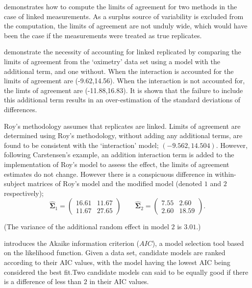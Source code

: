 \documentclass[12pt, a4paper]{report}
\theoremstyle{plain}
\theoremstyle{definition}
\theoremstyle{remark}
\begin{document}
\citet{BXC2008} demonstrates how to compute the limits of agreement for two methods in the case of linked measurements. As a surplus source of variability is excluded from the computation, the limits of agreement are not unduly wide, which would have been the case if the measurements were treated as true replicates.

\citet{BXC2008} demonstrate the necessity of accounting for linked replicated by comparing the limits of agreement from the `oximetry' data set using a model with the additional term, and one without. When the interaction is accounted for the limits of agreement are (-9.62,14.56). When the interaction is not accounted for, the limts of agreement are (-11.88,16.83). It is shown that the failure to include this additional term results in an over-estimation of the standard deviations of differences.

Roy's methodology assumes that replicates are linked. Limits of agreement are determined using Roy's methodology, without adding any additional terms, are found to be consistent with the `interaction' model; $(-9.562, 14.504 )$.  However, following Carstensen's example, an addition interaction term is added to the implementation of Roy's model to assess the effect, the limits of agreement estimates do not change. However there is a conspicuous difference in within-subject matrices of Roy's model and the modified model (denoted $1$ and $2$ respectively);
\begin{equation}
	\hat{\boldsymbol{\Sigma}}_{1}= \left(\begin{array}{cc}
		16.61 &	11.67\\
		11.67 & 27.65 \end{array}\right) \qquad
	\boldsymbol{\hat{\Sigma}}_{2}= \left( \begin{array}{cc}
		7.55 & 2.60 \\
		2.60 & 18.59 \end{array} \right). 
\end{equation}

\noindent (The variance of the additional random effect in model $2$ is $3.01$.)

\citet{akaike} introduces the Akaike information criterion ($AIC$), a model 
selection tool based on the likelihood function. Given a data set, candidate models
are ranked according to their AIC values, with the model having the lowest AIC being considered the best fit.Two candidate models can said to be equally good if there is a difference of less than $2$ in their AIC values.
\end{document}
